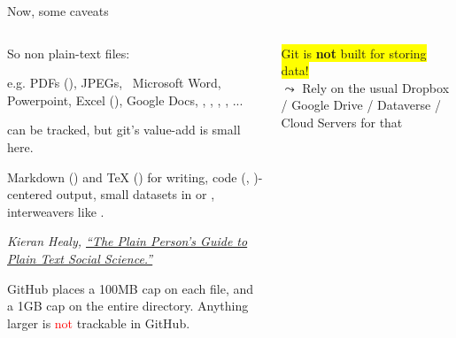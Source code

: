 \documentclass[ignorenonframetext, 10pt, aspectratio=169]{beamer}
\begin{document}
\begin{frame}{Now, some caveats}
\vspace{-0.3cm}
\begin{columns}[T]
\begin{column}{0.6\textwidth}

  So non plain-text files:\\

  \medskip

   {\small e.g.  PDFs (), \pause JPEGs,\pause~ Microsoft Word, \pause Powerpoint,  Excel (), Google Docs, \pause {}, , , , ...}

 can be tracked, but git's value-add is small here.
\pause

  \pause

 {\small Markdown () and TeX () for writing,  \pause code (, )-centered output, small datasets in  or , \pause interweavers  like .}

\bigskip
 {\footnotesize \emph{Kieran Healy, \href{https://kieranhealy.org/publications/plain-person-text/}{``The Plain Person’s Guide to Plain Text Social Science.''}}}

\medskip

 {\footnotesize GitHub places a 100MB cap on each file, and a 1GB cap on the entire directory. Anything larger is \textcolor{red}{not} trackable in GitHub. }

\end{column}
\begin{column}{0.4\textwidth}
  \colorbox{yellow}{Git is {\textbf{not}} built for storing data!}\\
\centering
{}
\flushleft
$\leadsto$ Rely on the usual Dropbox / Google Drive / Dataverse / Cloud Servers for that
\end{column}
\end{columns}
\end{frame}
\end{document}
